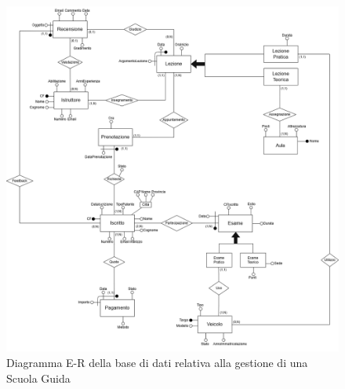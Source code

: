 \documentclass[10pt,twoside]{article}
\begin{document}
\begin{figure}[H]        
    \includegraphics[width=1\linewidth]{img/ER_ScuolaGuida.drawio.png}\centering
    \caption{Diagramma E-R della base di dati relativa alla gestione di una Scuola Guida}
    \label{fig:diagrammaER}
\end{figure}

\newpage
\end{document}

